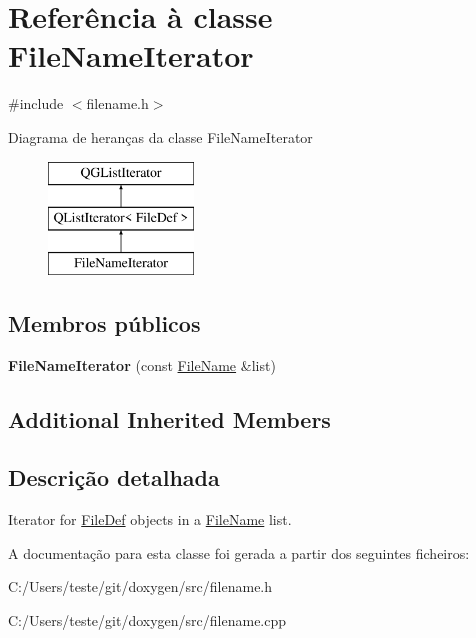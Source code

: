 \hypertarget{class_file_name_iterator}{\section{Referência à classe File\-Name\-Iterator}
\label{class_file_name_iterator}
}


{\ttfamily \#include $<$filename.\-h$>$}

Diagrama de heranças da classe File\-Name\-Iterator\begin{figure}[H]
\begin{center}
\leavevmode
\includegraphics[height=3.000000cm]{class_file_name_iterator}
\end{center}
\end{figure}
\subsection*{Membros públicos}
\begin{DoxyCompactItemize}
\item 
\hypertarget{class_file_name_iterator_a3366e5162d7d9c95911fa5e0850a2ffd}{{\bfseries File\-Name\-Iterator} (const \hyperlink{class_file_name}{File\-Name} \&list)}\label{class_file_name_iterator_a3366e5162d7d9c95911fa5e0850a2ffd}

\end{DoxyCompactItemize}
\subsection*{Additional Inherited Members}


\subsection{Descrição detalhada}
Iterator for \hyperlink{class_file_def}{File\-Def} objects in a \hyperlink{class_file_name}{File\-Name} list. 

A documentação para esta classe foi gerada a partir dos seguintes ficheiros\-:\begin{DoxyCompactItemize}
\item 
C\-:/\-Users/teste/git/doxygen/src/filename.\-h\item 
C\-:/\-Users/teste/git/doxygen/src/filename.\-cpp\end{DoxyCompactItemize}
